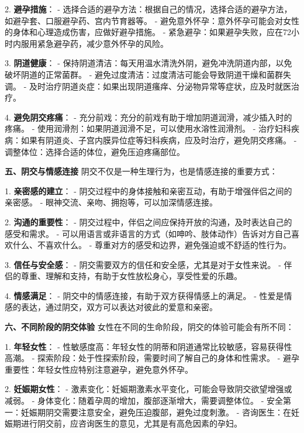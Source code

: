 \begin{enumerate}
  2. \textbf{避孕措施}：
     - 选择合适的避孕方法：根据自己的情况，选择合适的避孕方法，如避孕套、口服避孕药、宫内节育器等。
     - 避免意外怀孕：意外怀孕可能会对女性的身体和心理造成伤害，应做好避孕措施。
     - 紧急避孕：如果避孕失败，应在72小时内服用紧急避孕药，减少意外怀孕的风险。

  3. \textbf{阴道健康}：
     - 保持阴道清洁：每天用温水清洗外阴，避免冲洗阴道内部，以免破坏阴道的正常菌群。
     - 避免过度清洁：过度清洁可能会导致阴道干燥和菌群失调。
     - 及时治疗阴道炎症：如果出现阴道瘙痒、分泌物异常等症状，应及时就医治疗。

  4. \textbf{避免阴交疼痛}：
     - 充分前戏：充分的前戏有助于增加阴道润滑，减少插入时的疼痛。
     - 使用润滑剂：如果阴道润滑不足，可以使用水溶性润滑剂。
     - 治疗妇科疾病：如果有阴道炎、子宫内膜异位症等妇科疾病，应及时治疗，避免阴交疼痛。
     - 调整体位：选择合适的体位，避免压迫疼痛部位。

  \textbf{五、阴交与情感连接}
  阴交不仅是一种生理行为，也是情感连接的重要方式：

  1. \textbf{亲密感的建立}：
     - 阴交过程中的身体接触和亲密互动，有助于增强伴侣之间的亲密感。
     - 眼神交流、亲吻、拥抱等，可以加深情感连接。

  2. \textbf{沟通的重要性}：
     - 阴交过程中，伴侣之间应保持开放的沟通，及时表达自己的感受和需求。
     - 可以用语言或非语言的方式（如呻吟、肢体动作）告诉对方自己喜欢什么、不喜欢什么。
     - 尊重对方的感受和边界，避免强迫或不舒适的性行为。

  3. \textbf{信任与安全感}：
     - 阴交需要双方的信任和安全感，尤其是对于女性来说。
     - 伴侣的尊重、理解和支持，有助于女性放松身心，享受性爱的乐趣。

  4. \textbf{情感满足}：
     - 阴交中的情感连接，有助于双方获得情感上的满足。
     - 性爱是情感的表达，通过阴交，双方可以表达对彼此的爱意和亲密。

  \textbf{六、不同阶段的阴交体验}
  女性在不同的生命阶段，阴交的体验可能会有所不同：

  1. \textbf{年轻女性}：
     - 性敏感度高：年轻女性的阴蒂和阴道通常比较敏感，容易获得性高潮。
     - 探索阶段：处于性探索阶段，需要时间了解自己的身体和性需求。
     - 避孕重要性：年轻女性应特别注意避孕，避免意外怀孕。

  2. \textbf{妊娠期女性}：
     - 激素变化：妊娠期激素水平变化，可能会导致阴交欲望增强或减弱。
     - 身体变化：随着孕周的增加，腹部逐渐增大，需要调整体位。
     - 安全第一：妊娠期阴交需要注意安全，避免压迫腹部，避免过度刺激。
     - 咨询医生：在妊娠期进行阴交前，应咨询医生的意见，尤其是有高危因素的孕妇。


\end{enumerate}
